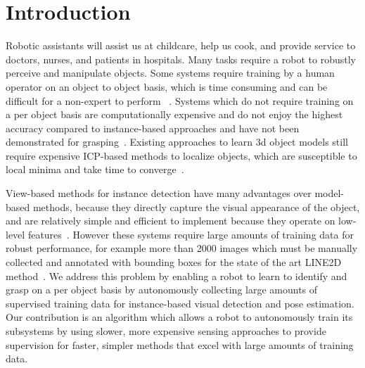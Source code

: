 \documentclass[conference]{IEEEtran}
\begin{document}

\section{Introduction}
Robotic assistants will assist us at childcare, help us cook, and
provide service to doctors, nurses, and patients in hospitals. Many
tasks require a robot to robustly perceive and manipulate objects.
Some systems require training by a human operator on an object to
object basis, which is time consuming and can be difficult for a
non-expert to perform ~\citep{ork14, lai11, lai11a}. Systems which do
not require training on a per object basis are computationally
expensive and do not enjoy the highest accuracy compared to
instance-based approaches and have not been demonstrated for
grasping~\citep{saxena08}.  Existing approaches to learn 3d object
models still require expensive ICP-based methods to localize objects,
which are susceptible to local minima and take time to
converge~\citep{krainin11}.

View-based methods for instance detection have many advantages over
model-based methods, because they directly capture the visual
appearance of the object, and are relatively simple and efficient to
implement because they operate on low-level features~\citep{hsiao13}.
However these systems require large amounts of training data for
robust performance, for example more than 2000 images which must be
manually collected and annotated with bounding boxes for the state of
the art LINE2D method~\citep{hinterstoisser12}.  We address this
problem by enabling a robot to learn to identify and grasp on a per
object basis by autonomously collecting large amounts of supervised
training data for instance-based visual detection and pose estimation.
Our contribution is an algorithm which allows a robot to autonomously
train its subsystems by using slower, more expensive sensing
approaches to provide supervision for faster, simpler methods that
excel with large amounts of training data.
\end{document}

